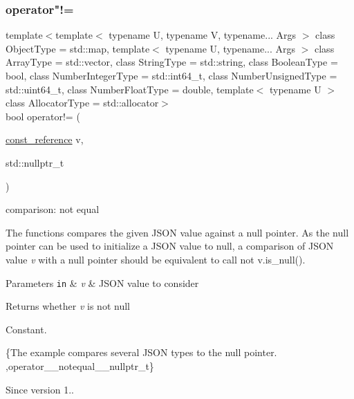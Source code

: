 \subsubsection{\texorpdfstring{operator"!=}{operator!=}\hspace{0.1cm}{\footnotesize\ttfamily [2/3]}}
{\footnotesize\ttfamily template$<$template$<$ typename U, typename V, typename... Args $>$ class Object\+Type = std\+::map, template$<$ typename U, typename... Args $>$ class Array\+Type = std\+::vector, class String\+Type  = std\+::string, class Boolean\+Type  = bool, class Number\+Integer\+Type  = std\+::int64\+\_\+t, class Number\+Unsigned\+Type  = std\+::uint64\+\_\+t, class Number\+Float\+Type  = double, template$<$ typename U $>$ class Allocator\+Type = std\+::allocator$>$ \\
bool operator!= (\begin{DoxyParamCaption}\item[{\hyperlink{classnlohmann_1_1basic__json_af677a29b0e66edc9f66e5167e4667071}{const\+\_\+reference}}]{v,  }\item[{std\+::nullptr\+\_\+t}]{ }\end{DoxyParamCaption})\hspace{0.3cm}{\ttfamily [friend]}}



comparison\+: not equal 

The functions compares the given J\+S\+ON value against a null pointer. As the null pointer can be used to initialize a J\+S\+ON value to null, a comparison of J\+S\+ON value {\itshape v} with a null pointer should be equivalent to call {\ttfamily not v.\+is\+\_\+null()}.


\begin{DoxyParams}[1]{Parameters}
\mbox{\tt in}  & {\em v} & J\+S\+ON value to consider \\
\hline
\end{DoxyParams}
\begin{DoxyReturn}{Returns}
whether {\itshape v} is not null
\end{DoxyReturn}
Constant.

\{The example compares several J\+S\+ON types to the null pointer. ,operator\+\_\+\+\_\+notequal\+\_\+\+\_\+nullptr\+\_\+t\}

\begin{DoxySince}{Since}
version 1.. 
\end{DoxySince}
\hypertarget{classnlohmann_1_1basic__json_a7f97a91ad8f1d5cf0b9213bd24f247c4}{}\label{classnlohmann_1_1basic__json_a7f97a91ad8f1d5cf0b9213bd24f247c4} 
